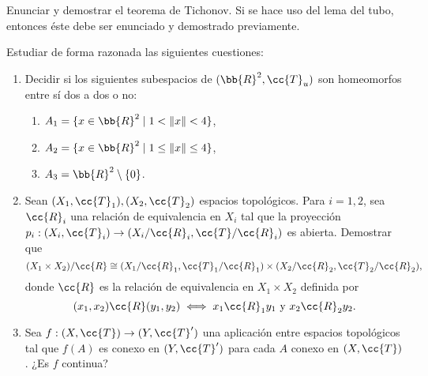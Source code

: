 \documentclass[12pt]{article}
\newcommand{\T}[0]{\cc{T}}
\begin{document}
    \begin{ejercicio}[2.5 puntos] Enunciar y demostrar el teorema de Tichonov. Si se hace uso del lema del tubo,
        entonces éste debe ser enunciado y demostrado previamente.        
    \end{ejercicio}


    \begin{ejercicio}[3 puntos] Estudiar de forma razonada las siguientes cuestiones:
        \begin{enumerate}
            \item Decidir si los siguientes subespacios de $(\bb{R}^2,\T_u)$ son homeomorfos entre sí dos a dos o no:
            \begin{enumerate}
                \item $A_1=\{x\in \bb{R}^2\mid 1<\|x\|<4\}$,
                \item $A_2=\{x\in \bb{R}^2\mid 1\leq \|x\|\leq 4\}$,
                \item $A_3=\bb{R}^2\setminus \{0\}$.
            \end{enumerate}

            \item Sean $(X_1,\T_1), (X_2,\T_2)$ espacios topológicos. Para $i=1,2$, sea $\cc{R}_i$ una relación de equivalencia
            en $X_i$ tal que la proyección $p_i:(X_i,\T_i)\to (X_i/\cc{R}_i,\T/\cc{R}_i)$ es abierta. Demostrar que
            \begin{equation*}
                (X_1\times X_2)/\cc{R} \cong (X_1/\cc{R}_1,\T_1/\cc{R}_1)\times (X_2/\cc{R}_2,\T_2/\cc{R}_2),
            \end{equation*}
            donde $\cc{R}$ es la relación de equivalencia en $X_1\times X_2$ definida por
            \begin{equation*}
                (x_1,x_2)\cc{R}(y_1,y_2) \iff x_1\cc{R}_1 y_1 \text{ y } x_2\cc{R}_2 y_2.
            \end{equation*}

            \item Sea $f:(X,\T)\to (Y,\T')$ una aplicación entre espacios topológicos tal que $f(A)$ es conexo en $(Y,\T')$
            para cada $A$ conexo en $(X,\T)$. ¿Es $f$ continua?
        \end{enumerate}
    \end{ejercicio}
\end{document}
